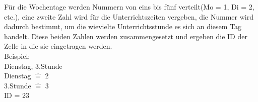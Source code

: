 \begin{description}[style=nextline]
	\item[Zusammensetzung der ID:]
		Für die Wochentage werden Nummern von eins bis fünf verteilt(Mo = 1, Di = 2, etc.), eine zweite Zahl wird für 		die Unterrichtszeiten vergeben, die Nummer wird dadurch bestimmt, um die wievielte Unterrichtsstunde es sich 			an diesem Tag handelt. Diese beiden Zahlen werden zusammengesetzt und ergeben die ID der Zelle in die sie 				eingetragen werden.\\
		Beispiel:\\	
					Dienstag, 3.Stunde\\
					Dienstag $\hat{=}$ 2\\
					3.Stunde $\hat{=}$ 3\\
					ID = 23\\
\end{description}

